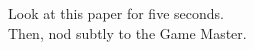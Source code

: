 \documentclass{article}
\begin{document}
\begin{infobox}
Look at this paper for five seconds. \\
Then, nod subtly to the Game Master.
\end{infobox}
\end{document}
